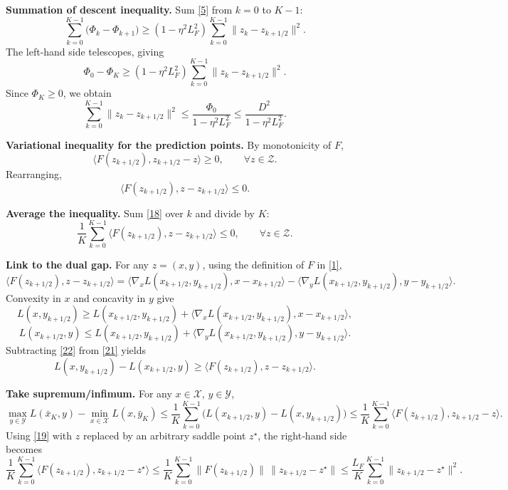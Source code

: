 \documentclass{article}
\begin{document}
\begin{enumerate}[label={[\arabic*]}, leftmargin=*]
\item \textbf{Summation of descent inequality.}  
   Sum \eqref{5} from $k=0$ to $K-1$:
   \[
   \sum_{k=0}^{K-1}\bigl(\Phi_k-\Phi_{k+1}\bigr)
   \ge (1-\eta^{2}L_F^{2})\sum_{k=0}^{K-1}\|z_k-z_{k+1/2}\|^{2}.
   \tag{14}
   \]
   The left‑hand side telescopes, giving
   \[
   \Phi_0-\Phi_{K}\ge (1-\eta^{2}L_F^{2})\sum_{k=0}^{K-1}\|z_k-z_{k+1/2}\|^{2}.
   \tag{15}
   \]
   Since $\Phi_{K}\ge0$, we obtain
   \[
   \sum_{k=0}^{K-1}\|z_k-z_{k+1/2}\|^{2}\le\frac{\Phi_0}{1-\eta^{2}L_F^{2}}
   \le\frac{D^{2}}{1-\eta^{2}L_F^{2}}.
   \tag{16}
   \]

\item \textbf{Variational inequality for the prediction points.}  
   By monotonicity of $F$,
   \[
   \langle F(z_{k+1/2}),z_{k+1/2}-z\rangle\ge0,\qquad\forall z\in\mathcal Z.
   \tag{17}
   \]
   Rearranging,
   \[
   \langle F(z_{k+1/2}),z-z_{k+1/2}\rangle\le0.
   \tag{18}
   \]

\item \textbf{Average the inequality.}  
   Sum \eqref{18} over $k$ and divide by $K$:
   \[
   \frac{1}{K}\sum_{k=0}^{K-1}\langle F(z_{k+1/2}),z-z_{k+1/2}\rangle\le0,
   \qquad\forall z\in\mathcal Z.
   \tag{19}
   \]

\item \textbf{Link to the dual gap.}  
   For any $z=(x,y)$, using the definition of $F$ in \eqref{1},
   \[
   \langle F(z_{k+1/2}),z-z_{k+1/2}\rangle
   =\langle\nabla_x L(x_{k+1/2},y_{k+1/2}),x-x_{k+1/2}\rangle
    -\langle\nabla_y L(x_{k+1/2},y_{k+1/2}),y-y_{k+1/2}\rangle .
   \tag{20}
   \]
   Convexity in $x$ and concavity in $y$ give
   \[
   L(x,y_{k+1/2})\ge L(x_{k+1/2},y_{k+1/2})+\langle\nabla_x L(x_{k+1/2},y_{k+1/2}),x-x_{k+1/2}\rangle,
   \tag{21}
   \]
   \[
   L(x_{k+1/2},y)\le L(x_{k+1/2},y_{k+1/2})+\langle\nabla_y L(x_{k+1/2},y_{k+1/2}),y-y_{k+1/2}\rangle .
   \tag{22}
   \]
   Subtracting \eqref{22} from \eqref{21} yields
   \[
   L(x,y_{k+1/2})-L(x_{k+1/2},y)
   \ge\langle F(z_{k+1/2}),z-z_{k+1/2}\rangle .
   \tag{23}
   \]

\item \textbf{Take supremum/infimum.}  
   For any $x\in\mathcal X$, $y\in\mathcal Y$,
   \[
   \max_{y\in\mathcal Y}L(\bar x_K,y)-\min_{x\in\mathcal X}L(x,\bar y_K)
   \le\frac{1}{K}\sum_{k=0}^{K-1}\bigl(L(x_{k+1/2},y)-L(x,y_{k+1/2})\bigr)
   \le\frac{1}{K}\sum_{k=0}^{K-1}\langle F(z_{k+1/2}),z_{k+1/2}-z\rangle .
   \tag{24}
   \]
   Using \eqref{19} with $z$ replaced by an arbitrary saddle point $z^\star$, the right‑hand side becomes
   \[
   \frac{1}{K}\sum_{k=0}^{K-1}\langle F(z_{k+1/2}),z_{k+1/2}-z^\star\rangle
   \le\frac{1}{K}\sum_{k=0}^{K-1}\|F(z_{k+1/2})\|\,\|z_{k+1/2}-z^\star\|
   \le\frac{L_F}{K}\sum_{k=0}^{K-1}\|z_{k+1/2}-z^\star\|^{2}.
   \tag{25}
   \]


\end{enumerate}
\end{document}
